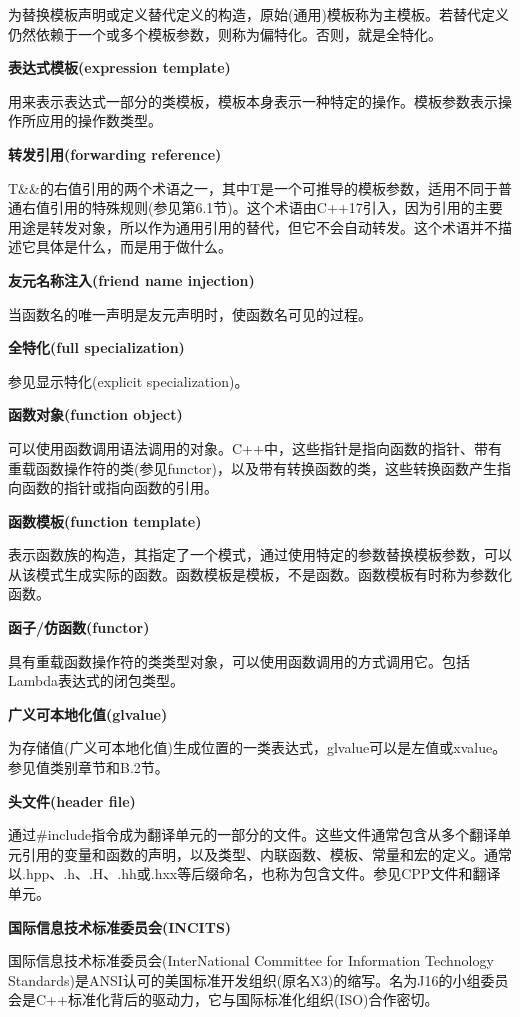 为替换模板声明或定义替代定义的构造，原始(通用)模板称为主模板。若替代定义仍然依赖于一个或多个模板参数，则称为偏特化。否则，就是全特化。

\noindent
\textbf{表达式模板(expression template)}

用来表示表达式一部分的类模板，模板本身表示一种特定的操作。模板参数表示操作所应用的操作数类型。

\noindent
\textbf{转发引用(forwarding reference)}

T\&\&的右值引用的两个术语之一，其中T是一个可推导的模板参数，适用不同于普通右值引用的特殊规则(参见第6.1节)。这个术语由C++17引入，因为引用的主要用途是转发对象，所以作为通用引用的替代，但它不会自动转发。这个术语并不描述它具体是什么，而是用于做什么。

\noindent
\textbf{友元名称注入(friend name injection)}

当函数名的唯一声明是友元声明时，使函数名可见的过程。

\noindent
\textbf{全特化(full specialization)}

参见显示特化(explicit specialization)。

\noindent
\textbf{函数对象(function object)}

可以使用函数调用语法调用的对象。C++中，这些指针是指向函数的指针、带有重载函数操作符的类(参见functor)，以及带有转换函数的类，这些转换函数产生指向函数的指针或指向函数的引用。

\noindent
\textbf{函数模板(function template)}

表示函数族的构造，其指定了一个模式，通过使用特定的参数替换模板参数，可以从该模式生成实际的函数。函数模板是模板，不是函数。函数模板有时称为参数化函数。

\noindent
\textbf{函子/仿函数(functor)}

具有重载函数操作符的类类型对象，可以使用函数调用的方式调用它。包括Lambda表达式的闭包类型。

\noindent
\textbf{广义可本地化值(glvalue)}

为存储值(广义可本地化值)生成位置的一类表达式，glvalue可以是左值或xvalue。参见值类别章节和B.2节。

\noindent
\textbf{头文件(header file)}

通过\#include指令成为翻译单元的一部分的文件。这些文件通常包含从多个翻译单元引用的变量和函数的声明，以及类型、内联函数、模板、常量和宏的定义。通常以.hpp、.h、.H、.hh或.hxx等后缀命名，也称为包含文件。参见CPP文件和翻译单元。

\noindent
\textbf{国际信息技术标准委员会(INCITS)}

国际信息技术标准委员会(InterNational Committee for Information Technology Standards)是ANSI认可的美国标准开发组织(原名X3)的缩写。名为J16的小组委员会是C++标准化背后的驱动力，它与国际标准化组织(ISO)合作密切。

